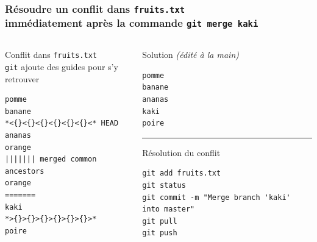 \documentclass[table,tikz,12pt,svgnames]{beamer}
\begin{document}
\begin{frame}[fragile]
\frametitle{Résoudre un conflit dans \texttt{fruits.txt}\\
\small immédiatement après la commande \texttt{git merge kaki}}
\begin{adjustwidth}{0cm}{-0.8cm}{}
	\begin{columns}[T] %
		\begin{column}{.55\textwidth}
			\color{darkgreen}%
			\noindent
			Conflit dans \texttt{fruits.txt} \\ {\footnotesize\texttt{git} ajoute des guides pour s'y retrouver}
			\color{black}
			\begin{verbatim}
pomme
banane
*<{}<{}<{}<{}<{}<{}<* HEAD
ananas
orange
||||||| merged common ancestors
orange
=======
kaki
*>{}>{}>{}>{}>{}>{}>*
poire
		\end{verbatim}
		\end{column}%
\PAUSE
		\begin{column}{.5\textwidth}
			\color{darkgreen}%
			Solution \textit{(édité à la main)}
			\color{black}
			\begin{verbatim}
pomme
banane
ananas
kaki
poire
			\end{verbatim}
\PAUSE

\color{gray}\rule{\linewidth}{3pt}
\color{darkgreen}%
Résolution du conflit
\color{black}
			\begin{verbatim}
git add fruits.txt
git status
git commit -m "Merge branch 'kaki' into master"
git pull
git push
			\end{verbatim}
		\end{column}%
	\end{columns}
\end{adjustwidth}
\end{frame}
\end{document}
